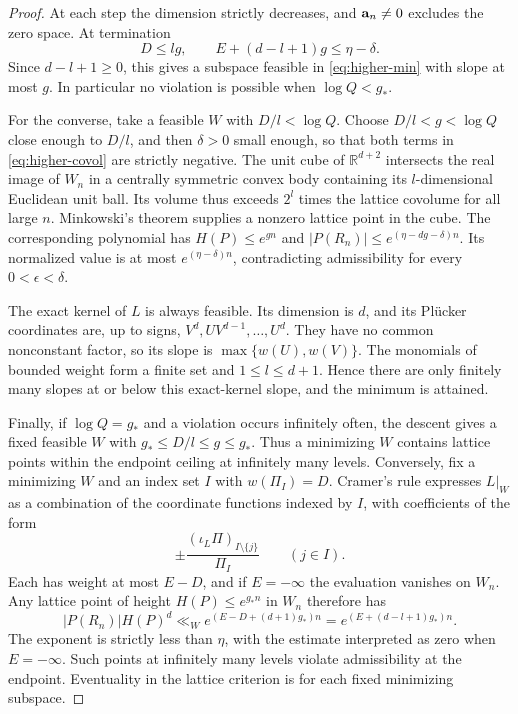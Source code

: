 \documentclass[11pt,a4paper,reqno]{amsart}
\theoremstyle{definition}
\theoremstyle{remark}
\numberwithin{equation}{section}
\begin{document}
\begin{proof}
At each step the dimension strictly decreases, and
\({\bf a}_n\ne0\) excludes the zero space. At termination
\[
 D\le lg,\qquad E+(d-l+1)g\le\eta-\delta .
\]
Since \(d-l+1\ge0\), this gives a subspace feasible in
\eqref{eq:higher-min} with slope at most \(g\). In particular
no violation is possible when \(\log Q<g_*\).

For the converse, take a feasible \(W\) with \(D/l<\log Q\).
Choose \(D/l<g<\log Q\) close enough to \(D/l\), and then
\(\delta>0\) small enough, so that both terms in
\eqref{eq:higher-covol} are strictly negative. The unit cube
of \(\mathbb R^{d+2}\) intersects the real image of \(W_n\)
in a centrally symmetric convex body containing its
\(l\)-dimensional Euclidean unit ball. Its volume thus
exceeds \(2^l\) times the lattice covolume for all large \(n\).
Minkowski's theorem supplies a nonzero lattice point in the
cube. The corresponding polynomial has \(H(P)\le e^{gn}\)
and \(|P(R_n)|\le e^{(\eta-dg-\delta)n}\). Its normalized
value is at most \(e^{(\eta-\delta)n}\), contradicting
admissibility for every \(0<\epsilon<\delta\).

The exact kernel of \(L\) is always feasible. Its dimension
is \(d\), and its Pl\"ucker coordinates are, up to signs,
\(V^d,UV^{d-1},\ldots,U^d\). They have no common nonconstant
factor, so its slope is \(\max\{w(U),w(V)\}\).
The monomials of bounded weight form a finite set and
\(1\le l\le d+1\). Hence there are only finitely many slopes
at or below this exact-kernel slope, and the minimum is attained.

Finally, if \(\log Q=g_*\) and a violation occurs infinitely
often, the descent gives a fixed feasible \(W\) with
\(g_*\le D/l\le g\le g_*\). Thus a minimizing \(W\) contains
lattice points within the endpoint ceiling at infinitely many
levels. Conversely, fix a minimizing \(W\) and an index
set \(I\) with \(w(\Pi_I)=D\). Cramer's rule expresses
\(L|_W\) as a combination of the coordinate functions
indexed by \(I\), with coefficients of the form
\[
 \pm\frac{(\iota_L\Pi)_{I\setminus\{j\}}}{\Pi_I}
 \qquad(j\in I).
\]
Each has weight at most \(E-D\), and if \(E=-\infty\)
the evaluation vanishes on \(W_n\). Any lattice point of
height \(H(P)\le e^{g_*n}\) in \(W_n\) therefore has
\[
 |P(R_n)|H(P)^d
 \ll_W e^{(E-D+(d+1)g_*)n}
 =e^{(E+(d-l+1)g_*)n}.
\]
The exponent is strictly less than \(\eta\), with the
estimate interpreted as zero when \(E=-\infty\).
Such points at infinitely many levels violate admissibility
at the endpoint. Eventuality in the lattice criterion is
for each fixed minimizing subspace.
\end{proof}
\end{document}
